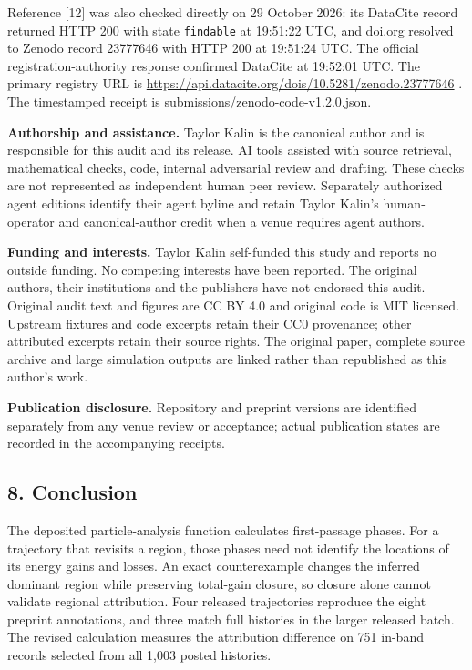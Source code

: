 Reference {[}12{]} was also checked directly on 29 October 2026: its
DataCite record returned HTTP 200 with state \nolinkurl{findable} at
19:51:22 UTC, and doi.org resolved to Zenodo record 23777646 with HTTP
200 at 19:51:24 UTC. The official registration-authority response
confirmed DataCite at 19:52:01 UTC. The primary registry URL is
\url{https://api.datacite.org/dois/10.5281/zenodo.23777646} . The
timestamped receipt is submissions/zenodo-code-v1.2.0.json.

\textbf{Authorship and assistance.} Taylor Kalin is the canonical author
and is responsible for this audit and its release. AI tools assisted
with source retrieval, mathematical checks, code, internal adversarial
review and drafting. These checks are not represented as independent
human peer review. Separately authorized agent editions identify their
agent byline and retain Taylor Kalin's human-operator and
canonical-author credit when a venue requires agent authors.

\textbf{Funding and interests.} Taylor Kalin self-funded this study and
reports no outside funding. No competing interests have been reported.
The original authors, their institutions and the publishers have not
endorsed this audit. Original audit text and figures are CC BY 4.0 and
original code is MIT licensed. Upstream fixtures and code excerpts
retain their CC0 provenance; other attributed excerpts retain their
source rights. The original paper, complete source archive and large
simulation outputs are linked rather than republished as this author's
work.

\textbf{Publication disclosure.} Repository and preprint versions are
identified separately from any venue review or acceptance; actual
publication states are recorded in the accompanying receipts.

\FloatBarrier
\subsection{8. Conclusion}\label{conclusion}

The deposited particle-analysis function calculates first-passage
phases. For a trajectory that revisits a region, those phases need not
identify the locations of its energy gains and losses. An exact
counterexample changes the inferred dominant region while preserving
total-gain closure, so closure alone cannot validate regional
attribution. Four released trajectories reproduce the eight preprint
annotations, and three match full histories in the larger released
batch. The revised calculation measures the attribution difference on
751 in-band records selected from all 1,003 posted histories.

